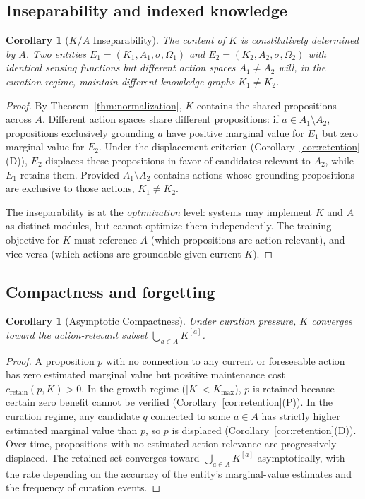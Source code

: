 \documentclass[11pt]{article}
\newtheorem{corollary}[theorem]{Corollary}
\theoremstyle{definition}
\theoremstyle{remark}
\begin{document}
\subsection{Inseparability and indexed knowledge}

\begin{corollary}[$K/A$ Inseparability]
\label{cor:inseparability}
The content of $K$ is constitutively determined by $A$. Two entities
$E_1 = (K_1, A_1, \sigma, \Omega_1)$ and $E_2 = (K_2, A_2, \sigma,
\Omega_2)$ with identical sensing functions but different action spaces
$A_1 \neq A_2$ will, in the curation regime, maintain different knowledge
graphs $K_1 \neq K_2$.
\end{corollary}

\begin{proof}
By Theorem~\ref{thm:normalization}, $K$ contains the shared propositions
across $A$. Different action spaces share different propositions:
if $a \in A_1 \setminus A_2$, propositions exclusively grounding $a$
have positive marginal value for $E_1$ but zero marginal value for
$E_2$. Under the displacement criterion
(Corollary~\ref{cor:retention}(D)), $E_2$ displaces these propositions
in favor of candidates relevant to $A_2$, while $E_1$ retains them.
Provided $A_1 \setminus A_2$ contains actions whose grounding
propositions are exclusive to those actions, $K_1 \neq K_2$.

The inseparability is at the \emph{optimization} level: systems may
implement $K$ and $A$ as distinct modules, but cannot optimize them
independently. The training objective for $K$ must reference $A$
(which propositions are action-relevant), and vice versa (which actions
are groundable given current $K$).
\end{proof}

\subsection{Compactness and forgetting}

\begin{corollary}[Asymptotic Compactness]
\label{cor:compactness}
Under curation pressure, $K$ converges toward the action-relevant
subset $\bigcup_{a \in A} K^{[a]}$.
\end{corollary}

\begin{proof}
A proposition $p$ with no connection to any current or foreseeable
action has zero estimated marginal value but positive maintenance cost
$c_{\text{retain}}(p, K) > 0$. In the growth regime ($|K| < K_{\max}$),
$p$ is retained because certain zero benefit cannot be verified
(Corollary~\ref{cor:retention}(P)). In the curation regime, any
candidate $q$ connected to some $a \in A$ has strictly higher estimated
marginal value than $p$, so $p$ is displaced
(Corollary~\ref{cor:retention}(D)). Over time, propositions with no
estimated action relevance are progressively displaced. The retained set
converges toward $\bigcup_{a \in A} K^{[a]}$ asymptotically, with the
rate depending on the accuracy of the entity's marginal-value estimates
and the frequency of curation events.
\end{proof}
\end{document}
